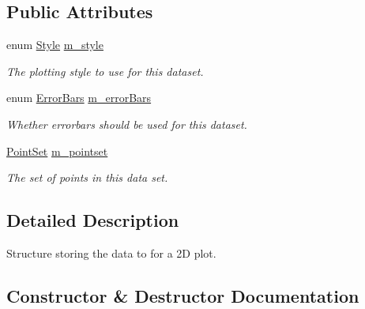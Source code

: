 \subsection*{Public Attributes}
\begin{DoxyCompactItemize}
\item 
enum \hyperlink{classns3_1_1Gnuplot2dDataset_abdad90b4b2abed9a198e4b19470de882}{Style} \hyperlink{structns3_1_1Gnuplot2dDataset_1_1Data2d_ad14f88e14259c14982ac1055020782e3}{m\+\_\+style}
\begin{DoxyCompactList}\small\item\em The plotting style to use for this dataset. \end{DoxyCompactList}\item 
enum \hyperlink{classns3_1_1Gnuplot2dDataset_a5984738d258811bed5eff163d4e3d648}{Error\+Bars} \hyperlink{structns3_1_1Gnuplot2dDataset_1_1Data2d_a39e295cad8ca25ee7ab6bf2f01fc5286}{m\+\_\+error\+Bars}
\begin{DoxyCompactList}\small\item\em Whether errorbars should be used for this dataset. \end{DoxyCompactList}\item 
\hyperlink{classns3_1_1Gnuplot2dDataset_a0bfbcfd6b610e459b2ad97425c8724ae}{Point\+Set} \hyperlink{structns3_1_1Gnuplot2dDataset_1_1Data2d_a7c940c3af73df4caef586555be6478fa}{m\+\_\+pointset}
\begin{DoxyCompactList}\small\item\em The set of points in this data set. \end{DoxyCompactList}\end{DoxyCompactItemize}


\subsection{Detailed Description}
Structure storing the data to for a 2D plot. 

\subsection{Constructor \& Destructor Documentation}
